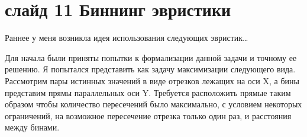 \documentclass[a4paper,12pt]{diplom}
\begin{document}
\section*{слайд 11 Биннинг эвристики}
Раннее у меня возникла идея использования следующих эвристик\dots

Для начала были приняты попытки к формализации данной задачи и точному ее решению. Я попытался представить как задачу максимизации 
следующего вида. Рассмотрим пары истинных значений в виде отрезков лежащих на оси X, а бины представим прямы параллельных оси Y. 
Требуется расположить прямые таким образом чтобы количество пересечений было максимально, с условием некоторых ограничений, 
на возможное пересечение отрезка только один раз, и расстояния между бинами.
\end{document}
